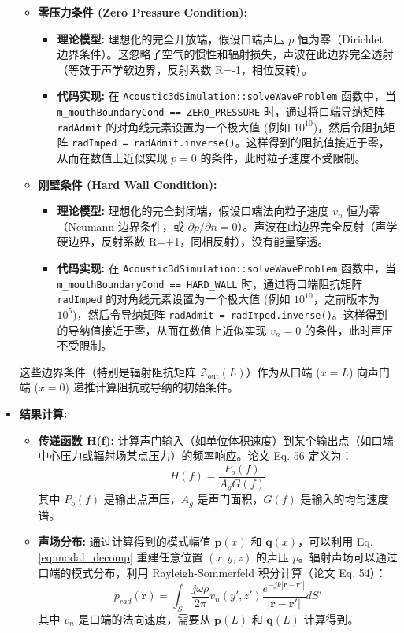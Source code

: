\documentclass{ctexart}
\begin{document}
\begin{itemize}
\begin{itemize}
        \item \textbf{零压力条件 (Zero Pressure Condition):}
            \begin{itemize}
                \item \textbf{理论模型:} 理想化的完全开放端，假设口端声压 $p$ 恒为零（Dirichlet 边界条件）。这忽略了空气的惯性和辐射损失，声波在此边界完全透射（等效于声学软边界，反射系数 R=-1，相位反转）。
                \item \textbf{代码实现:} 在 \texttt{Acoustic3dSimulation::solveWaveProblem} 函数中，当 \texttt{m\_mouthBoundaryCond == ZERO\_PRESSURE} 时，通过将口端导纳矩阵 \texttt{radAdmit} 的对角线元素设置为一个极大值 (例如 $10^{10}$)，然后令阻抗矩阵 \texttt{radImped = radAdmit.inverse()}。这样得到的阻抗值接近于零，从而在数值上近似实现 $p=0$ 的条件，此时粒子速度不受限制。
            \end{itemize}

        \item \textbf{刚壁条件 (Hard Wall Condition):}
            \begin{itemize}
                \item \textbf{理论模型:} 理想化的完全封闭端，假设口端法向粒子速度 $v_n$ 恒为零（Neumann 边界条件，或 $\partial p / \partial n = 0$）。声波在此边界完全反射（声学硬边界，反射系数 R=+1，同相反射），没有能量穿透。
                \item \textbf{代码实现:} 在 \texttt{Acoustic3dSimulation::solveWaveProblem} 函数中，当 \texttt{m\_mouthBoundaryCond == HARD\_WALL} 时，通过将口端阻抗矩阵 \texttt{radImped} 的对角线元素设置为一个极大值 (例如 $10^{10}$，之前版本为 $10^5$)，然后令导纳矩阵 \texttt{radAdmit = radImped.inverse()}。这样得到的导纳值接近于零，从而在数值上近似实现 $v_n=0$ 的条件，此时声压不受限制。
            \end{itemize}
    \end{itemize}
    这些边界条件（特别是辐射阻抗矩阵 $\boldsymbol{\mathcal{Z}}_{\text{out}}(L)$）作为从口端 ($x=L$) 向声门端 ($x=0$) 递推计算阻抗或导纳的初始条件。
    \item \textbf{结果计算:}
        \begin{itemize}
            \item \textbf{传递函数 H(f):} 计算声门输入（如单位体积速度）到某个输出点（如口端中心压力或辐射场某点压力）的频率响应。论文 Eq. 56 定义为：
            \[ H(f) = \frac{P_o(f)}{A_g G(f)} \]
            其中 $P_o(f)$ 是输出点声压，$A_g$ 是声门面积，$G(f)$ 是输入的均匀速度谱。
            \item \textbf{声场分布:} 通过计算得到的模式幅值 $\mathbf{p}(x)$ 和 $\mathbf{q}(x)$，可以利用 Eq. \eqref{eq:modal_decomp} 重建任意位置 $(x,y,z)$ 的声压 $p$。辐射声场可以通过口端的模式分布，利用 Rayleigh-Sommerfeld 积分计算（论文 Eq. 54）：
            \[ p_{rad}(\mathbf{r}) = \int_S \frac{j\omega\rho}{2\pi} v_n(y', z') \frac{e^{-jk|\mathbf{r}-\mathbf{r}'|}}{|\mathbf{r}-\mathbf{r}'|} dS' \]
            其中 $v_n$ 是口端的法向速度，需要从 $\mathbf{p}(L)$ 和 $\mathbf{q}(L)$ 计算得到。
        \end{itemize}
\end{itemize}
\end{document}
